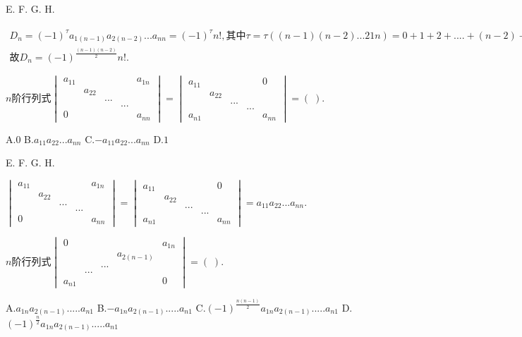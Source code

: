 E.   F.   G.   H.

$\begin{array}{l}D_n=(-1)^\tau a_{1(n-1)}a_{2(n-2)}...a_{nn}=(-1)^\tau n!,\mathrm{其中}\tau=\tau((n-1)(n-2)...21n)=0+1+2+....+(n-2)+0=\frac{(n-1)(n-2)}2\\故D_n=(-1)^\frac{(n-1)(n-2)}2n!.\end{array}$


$n\mathrm{阶行列式}\begin{vmatrix}a_{11}&&&&a_{1n}\\&a_{22}&&&\\&&...&&\\&&&...&\\0&&&&a_{nn}\end{vmatrix}=\begin{vmatrix}a_{11}&&&&0\\&a_{22}&&&\\&&...&&\\&&&...&\\a_{n1}&&&&a_{nn}\end{vmatrix}=(\;).$

A.$0$   B.$a_{11}a_{22}...a_{nn}$   C.$-a_{11}a_{22}...a_{nn}$   D.$1$

E.   F.   G.   H.

$\begin{vmatrix}a_{11}&&&&a_{1n}\\&a_{22}&&&\\&&...&&\\&&&...&\\0&&&&a_{nn}\end{vmatrix}=\begin{vmatrix}a_{11}&&&&0\\&a_{22}&&&\\&&...&&\\&&&...&\\a_{n1}&&&&a_{nn}\end{vmatrix}=a_{11}a_{22}...a_{nn}.$


$n\mathrm{阶行列式}\begin{vmatrix}0&&&&a_{1n}\\&&&a_{2(n-1)}&\\&&...&&\\&...&&&\\a_{n1}&&&&0\end{vmatrix}=(\;).$

A.$a_{1n}a_{2(n-1)}.....a_{n1}$   B.$-a_{1n}a_{2(n-1)}.....a_{n1}$   C.$(-1)^{\textstyle\frac{n(n-1)}2}a_{1n}a_{2(n-1)}.....a_{n1}$   D.$(-1)^{\textstyle\frac n2}a_{1n}a_{2(n-1)}.....a_{n1}$

